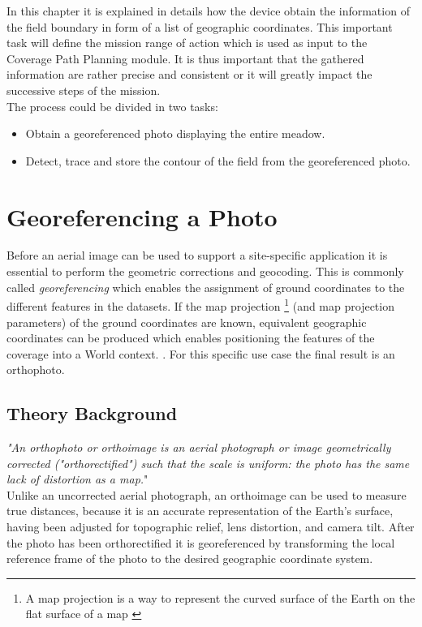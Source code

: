 In this chapter it is explained in details how the device obtain the information of the field boundary in form of a list of geographic coordinates. 
This important task will define the mission range of action which is used as input to the Coverage Path Planning module. It is thus important that the gathered information are rather precise and consistent or it will greatly impact the successive steps of the mission.\\
The process could be divided in two tasks:
\begin{itemize}
	\item Obtain a georeferenced photo displaying the entire meadow.
	\item Detect, trace and store the contour of the field from the georeferenced photo.
\end{itemize}

\section{Georeferencing a Photo} %
\label{sec:georeferenced_photo}
Before an aerial image can be used to support a site-specific application it is essential to perform the geometric corrections and geocoding. This is commonly called \textit{georeferencing} which enables the assignment of ground coordinates to the different features in the datasets. If the map projection \footnote{A map projection is a way to represent the curved surface
of the Earth on the flat surface of a map \cite{PosAccuracyGE}} (and map projection parameters) of the ground coordinates are known, equivalent geographic coordinates can be produced which enables positioning the features of the coverage into a World context. \cite{georefPractice}.
For this specific use case the final result is an orthophoto.

\subsection{Theory Background} %
\label{sub:theory_background}
\textit{"An orthophoto or orthoimage is an aerial photograph or image geometrically corrected ("orthorectified") such that the scale is uniform: the photo has the same lack of distortion as a map.}"\cite{orthophoto&GIS}\\

Unlike an uncorrected aerial photograph, an orthoimage can be used to measure true distances, because it is an accurate representation of the Earth's surface, having been adjusted for topographic relief, lens distortion, and camera tilt.
After the photo has been orthorectified it is georeferenced by transforming the local reference frame of the photo to the desired geographic coordinate system.

